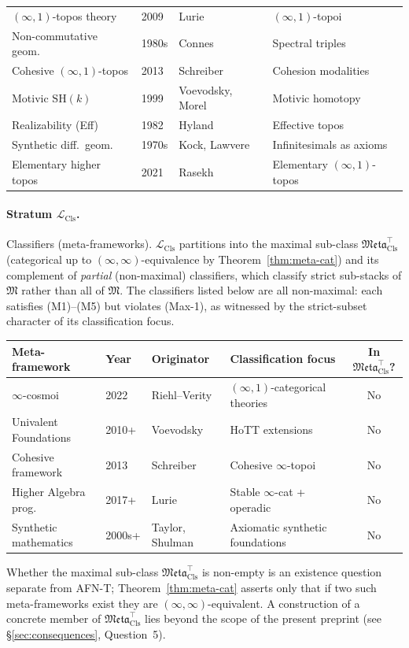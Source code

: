 \documentclass[11pt]{article}
\theoremstyle{plain}
\theoremstyle{definition}
\newcommand{\fM}{\mathfrak{M}}
\newcommand{\Meta}{\mathfrak{Meta}}
\newcommand{\LCls}{\mathcal{L}_{\mathrm{Cls}}}
\begin{document}
\begin{longtable}{@{}p{3.8cm}l p{4cm} p{4.6cm}@{}}
$(\infty, 1)$-topos theory & 2009 & Lurie & $(\infty, 1)$-topoi \\
Non-commutative geom.\ & 1980s & Connes & Spectral triples \\
Cohesive $(\infty, 1)$-topos & 2013 & Schreiber & Cohesion modalities \\
Motivic $\mathrm{SH}(k)$ & 1999 & Voevodsky, Morel & Motivic homotopy \\
Realizability (Eff) & 1982 & Hyland & Effective topos \\
Synthetic diff.~geom.\ & 1970s & Kock, Lawvere & Infinitesimals as axioms \\
Elementary higher topos & 2021 & Rasekh & Elementary $(\infty, 1)$-topos \\
\bottomrule
\end{longtable}

\paragraph{Stratum $\LCls$.} Classifiers (meta-frameworks). $\LCls$ partitions into the maximal sub-class $\Meta_{\mathrm{Cls}}^{\top}$ (categorical up to $(\infty, \infty)$-equivalence by Theorem~\ref{thm:meta-cat}) and its complement of \emph{partial} (non-maximal) classifiers, which classify strict sub-stacks of $\fM$ rather than all of $\fM$. The classifiers listed below are all non-maximal: each satisfies (M1)--(M5) but violates (Max-1), as witnessed by the strict-subset character of its classification focus.

\begin{longtable}{@{}p{3.3cm}l p{3cm} p{4.4cm}c@{}}
\toprule
Meta-framework & Year & Originator & Classification focus & In $\Meta_{\mathrm{Cls}}^{\top}$? \\ \midrule
$\infty$-cosmoi & 2022 & Riehl--Verity & $(\infty, 1)$-categorical theories & No \\
Univalent Foundations & 2010+ & Voevodsky & HoTT extensions & No \\
Cohesive framework & 2013 & Schreiber & Cohesive $\infty$-topoi & No \\
Higher Algebra prog.\ & 2017+ & Lurie & Stable $\infty$-cat + operadic & No \\
Synthetic mathematics & 2000s+ & Taylor, Shulman & Axiomatic synthetic foundations & No \\
\bottomrule
\end{longtable}

Whether the maximal sub-class $\Meta_{\mathrm{Cls}}^{\top}$ is non-empty is an existence question separate from AFN-T; Theorem~\ref{thm:meta-cat} asserts only that if two such meta-frameworks exist they are $(\infty, \infty)$-equivalent. A construction of a concrete member of $\Meta_{\mathrm{Cls}}^{\top}$ lies beyond the scope of the present preprint (see \S\ref{sec:consequences}, Question~5).
\end{document}
